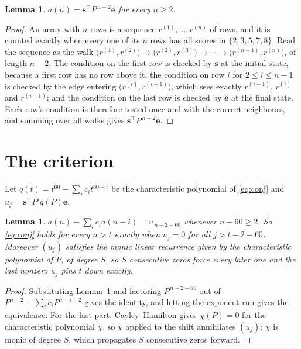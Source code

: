 \documentclass[11pt,a4paper]{article}
\theoremstyle{plain}
\newtheorem{lemma}[theorem]{Lemma}
\theoremstyle{definition}
\begin{document}
\begin{lemma}\label{lem:walk}
$a(n)=\mathbf{s}^{\!\top}P^{\,n-2}\mathbf{e}$ for every $n\ge2$.
\end{lemma}

\begin{proof}
An array with $n$ rows is a sequence $r^{(1)},\dots,r^{(n)}$ of rows, and it is counted
exactly when every one of its $n$ rows has all scores in $\{2,3,5,7,8\}$. Read the sequence as the
walk $\bigl(r^{(1)},r^{(2)}\bigr)\to\bigl(r^{(2)},r^{(3)}\bigr)\to\cdots\to
\bigl(r^{(n-1)},r^{(n)}\bigr)$, of length $n-2$. The condition on the first row is
checked by $\mathbf{s}$ at the initial state, because a first row has no row above it; the
condition on row $i$ for $2\le i\le n-1$ is checked by the edge entering
$\bigl(r^{(i)},r^{(i+1)}\bigr)$, which sees exactly $r^{(i-1)}$, $r^{(i)}$ and
$r^{(i+1)}$; and the condition on the last row is checked by $\mathbf{e}$ at the final
state. Each row's condition is therefore tested once and with the correct neighbours, and
summing over all walks gives $\mathbf{s}^{\!\top}P^{\,n-2}\mathbf{e}$.
\end{proof}

\section{The criterion}

Let $q(t)=t^{60}-\sum_i c_i t^{60-i}$ be the characteristic polynomial of
\eqref{eq:conj} and $u_j=\mathbf{s}^{\!\top}P^{j}q(P)\mathbf{e}$.

\begin{lemma}\label{lem:crit}
$a(n)-\sum_i c_i a(n-i)=u_{\,n-2-60}$ whenever $n-60\ge2$. So \eqref{eq:conj}
holds for every $n>t$ exactly when $u_j=0$ for all $j>t-2-60$. Moreover $(u_j)$
satisfies the monic linear recurrence given by the characteristic polynomial of $P$, of
degree $S$, so $S$ consecutive zeros force every later one and the last nonzero $u_j$ pins
$t$ down exactly.
\end{lemma}

\begin{proof}
Substituting Lemma~\ref{lem:walk} and factoring $P^{\,n-2-60}$ out of
$P^{n-2}-\sum_i c_i P^{n-i-2}$ gives the identity, and letting the exponent run gives the
equivalence. For the last part, Cayley--Hamilton gives $\chi(P)=0$ for the characteristic
polynomial $\chi$, so $\chi$ applied to the shift annihilates $(u_j)$; $\chi$ is monic of
degree $S$, which propagates $S$ consecutive zeros forward.
\end{proof}
\end{document}
